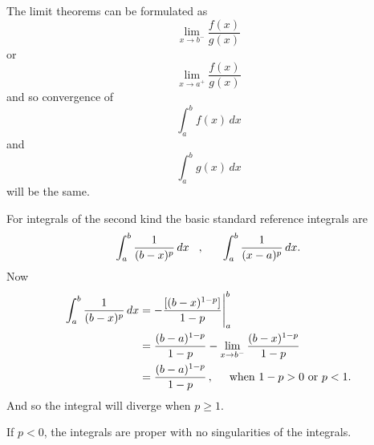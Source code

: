 \documentclass[12pt,a4paper]{report}
\theoremstyle{definition}
\theoremstyle{plain}
\begin{document}
The limit theorems can be formulated as 
$$\lim_{x\rightarrow b^-}\frac{f(x)}{g(x)}$$ or $$\lim_{x\rightarrow a^+}\frac{f(x)}{g(x)}$$ and so convergence of $$\int_a^b f(x)\, dx$$ and $$\int_a^bg(x)\, dx$$ will be the same.

For integrals of the second kind the basic standard reference integrals are $$\int_a^b\frac{1}{(b-x)^p}\, dx \hspace{0.3cm}, \hspace{0.6cm} \int_a^b\frac{1}{(x - a)^p}\, dx.$$ Now 
\begin{align*}
\int_a^b\frac{1}{(b - x)^p}\, dx & = -\frac{[(b - x)^{1 - p}]}{1-p}\Bigg|_a^b\\
                                 & = \frac{(b -a)^{1-p}}{1-p} - \lim_{x \rightarrow b^-} \frac{(b-x)^{1-p}}{1 - p}\\
                                 & = \frac{(b-a)^{1-p}}{1 - p}\, , \hspace{0.5cm}\text{when}\,\, 1 - p > 0\,\, \text{or}\,\, p < 1.
\end{align*}
And so the integral will diverge when $p\geq 1$.

If $p < 0$, the integrals are proper with no singularities of the integrals.
\end{document}

